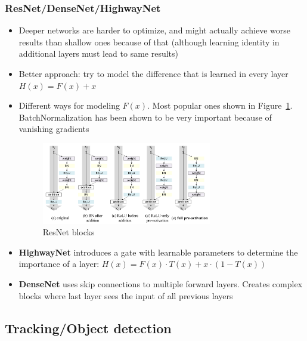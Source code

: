 \subsubsection{ResNet/DenseNet/HighwayNet}
\begin{itemize}
	\item Deeper networks are harder to optimize, and might actually achieve worse results than shallow ones because of that (although learning identity in additional layers must lead to same results)
	\item Better approach: try to model the difference that is learned in every layer $H(x) = F(x) + x$
	\item Different ways for modeling $F(x)$. Most popular ones shown in Figure~\ref{fig:CNN_ResNet_blocks}. BatchNormalization has been shown to be very important because of vanishing gradients
	\begin{figure}[ht!]
		\centering
		\includegraphics[width=0.7\textwidth]{figures/CNN_ResNet_blocks.png}
		\caption{ResNet blocks}
		\label{fig:CNN_ResNet_blocks}
	\end{figure}
	\item \textbf{HighwayNet} introduces a gate with learnable parameters to determine the importance of a layer: $H(x) = F(x) \cdot T(x) + x \cdot \left(1 - T\left(x\right)\right)$
	\item \textbf{DenseNet} uses skip connections to multiple forward layers. Creates complex blocks where last layer sees the input of all previous layers
\end{itemize}
\subsection{Tracking/Object detection}
